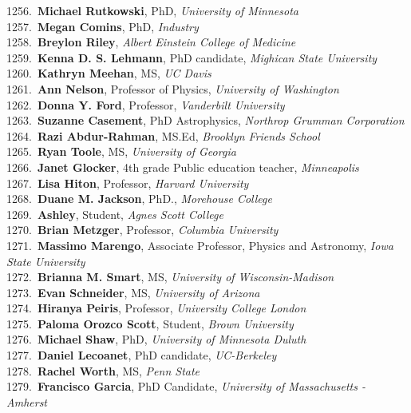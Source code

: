 1256.~{\bf Michael Rutkowski}, PhD, {\sl University of Minnesota} \\
1257.~{\bf Megan Comins}, PhD, {\sl Industry} \\
1258.~{\bf Breylon Riley}, {\sl Albert Einstein College of Medicine} \\
1259.~{\bf Kenna D. S. Lehmann}, PhD candidate, {\sl Mighican State University} \\
1260.~{\bf Kathryn Meehan}, MS, {\sl UC Davis} \\
1261.~{\bf Ann Nelson}, Professor of Physics, {\sl University of Washington} \\
1262.~{\bf Donna Y. Ford}, Professor, {\sl Vanderbilt University} \\
1263.~{\bf Suzanne Casement}, PhD Astrophysics, {\sl Northrop Grumman Corporation} \\
1264.~{\bf Razi Abdur-Rahman}, MS.Ed, {\sl Brooklyn Friends School} \\
1265.~{\bf Ryan Toole}, MS, {\sl University of Georgia} \\
1266.~{\bf Janet Glocker}, 4th grade Public education teacher, {\sl Minneapolis } \\
1267.~{\bf Lisa Hiton}, Professor, {\sl Harvard University} \\
1268.~{\bf Duane M. Jackson}, PhD., {\sl Morehouse College} \\
1269.~{\bf Ashley}, Student, {\sl Agnes Scott College} \\
1270.~{\bf Brian Metzger}, Professor, {\sl Columbia University} \\
1271.~{\bf Massimo Marengo}, Associate Professor, Physics and Astronomy, {\sl Iowa State University} \\
1272.~{\bf Brianna M. Smart}, MS, {\sl University of Wisconsin-Madison} \\
1273.~{\bf Evan Schneider}, MS, {\sl University of Arizona} \\
1274.~{\bf Hiranya Peiris}, Professor, {\sl University College London} \\
1275.~{\bf Paloma Orozco Scott}, Student, {\sl Brown University} \\
1276.~{\bf Michael Shaw}, PhD, {\sl University of Minnesota Duluth} \\
1277.~{\bf Daniel Lecoanet}, PhD candidate, {\sl UC-Berkeley} \\
1278.~{\bf Rachel Worth}, MS, {\sl Penn State} \\
1279.~{\bf Francisco Garcia}, PhD Candidate, {\sl University of Massachusetts - Amherst} \\
